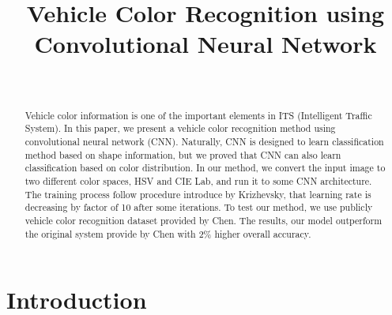 \documentclass[conference]{IEEEtran}
\begin{document}
\title{Vehicle Color Recognition using Convolutional Neural Network}


\author{%
\\} %



\maketitle


\begin{abstract}
Vehicle color information is one of the important elements in ITS (Intelligent Traffic System). In this paper, we present a vehicle color recognition method using convolutional neural network (CNN). Naturally, CNN is designed to learn classification method based on shape information, but we proved that CNN can also learn classification based on color distribution. In our method, we convert the input image to two different color spaces, HSV and CIE Lab, and run it to some CNN architecture. The training process follow procedure introduce by Krizhevsky, that learning rate is decreasing by factor of 10 after some iterations. To test our method, we use publicly vehicle color recognition dataset provided by Chen. The results, our model outperform the original system provide by Chen with 2\% higher overall accuracy.
\end{abstract}





\IEEEpeerreviewmaketitle



\section{Introduction}
\end{document}
